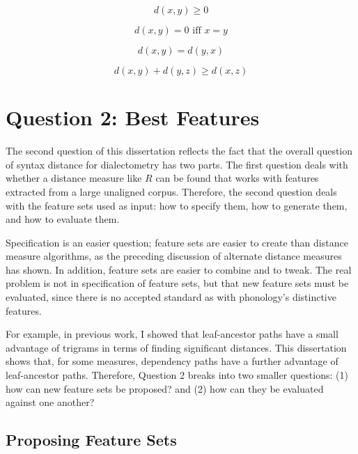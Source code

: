 \begin{equation}
  d(x,y) \ge 0
  \label{distance-properties-positive}
\end{equation}

\begin{equation}
 d(x,y) = 0 \textrm{ iff } x=y
\end{equation}

\begin{equation}
  d(x,y) = d(y,x)
\end{equation}

\begin{equation}
  d(x,y) + d(y,z) \ge d(x,z)
\label{distance-properties-triangle}
\end{equation}

\section{Question 2: Best Features}

The second question of this dissertation reflects the fact that the
overall question of syntax distance for dialectometry has two
parts. The first question deals with whether a distance measure like
$R$ can be found that works with features extracted from a
large unaligned corpus. Therefore, the second question deals with the
feature sets used as input: how to specify them, how to generate them,
and how to evaluate them.

Specification is an easier question; feature sets are easier
to create than distance measure algorithms, as the preceding
discussion of alternate distance measures has shown. In addition,
feature sets are easier to combine and to tweak. The real problem is
not in specification of feature sets, but that new feature sets must
be evaluated, since there is no accepted standard as with phonology's
distinctive features.

For example, in previous work, I showed that leaf-ancestor paths have a small
advantage of trigrams \cite{sanders07} in terms of finding significant
distances. This dissertation shows that, for some measures, dependency
paths have a further advantage of leaf-ancestor paths. Therefore,
Question 2 breaks into two smaller questions: (1) how can new feature sets
be proposed? and (2) how can they be evaluated against one another?

\subsection{Proposing Feature Sets}

